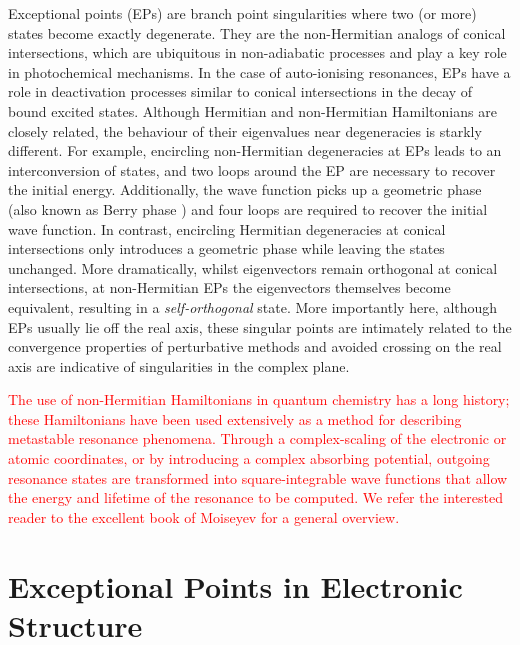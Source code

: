 \documentclass[aps,prb,reprint,noshowkeys,linenumbers,superscriptaddress]{revtex4-1}
\newcommand{\titou}[1]{\textcolor{red}{#1}}
\begin{document}
Exceptional points (EPs) are branch point singularities where two (or more) states become exactly degenerate. \cite{MoiseyevBook,Heiss_1988,Heiss_1990,Heiss_1999,Berry_2011,Heiss_2012,Heiss_2016,Benda_2018}
They are the non-Hermitian analogs of conical intersections, \cite{Yarkony_1996} which are ubiquitous in non-adiabatic processes and play a key role in photochemical mechanisms.
In the case of auto-ionising resonances, EPs have a role in deactivation processes similar to conical intersections in the decay of bound excited states. \cite{Benda_2018}
Although Hermitian and non-Hermitian Hamiltonians are closely related, the behaviour of their eigenvalues near degeneracies is starkly different.
For example, encircling non-Hermitian degeneracies at EPs leads to an interconversion of states, and two loops around the EP are necessary to recover the initial energy. \cite{MoiseyevBook,Heiss_2016,Benda_2018}
Additionally, the wave function picks up a geometric phase (also known as Berry phase \cite{Berry_1984}) and four loops are required to recover the initial wave function.
In contrast, encircling Hermitian degeneracies at conical intersections only introduces a geometric phase while leaving the states unchanged.
More dramatically, whilst eigenvectors remain orthogonal at conical intersections, at non-Hermitian EPs the eigenvectors themselves become equivalent, resulting in a \textit{self-orthogonal} state. \cite{MoiseyevBook}
More importantly here, although EPs usually lie off the real axis, these singular points are intimately related to the convergence properties of perturbative methods and avoided crossing on the real axis are indicative of singularities in the complex plane. \cite{BenderBook,Olsen_1996,Olsen_2000,Olsen_2019,Mihalka_2017a,Mihalka_2017b,Mihalka_2019}

\titou{The use of non-Hermitian Hamiltonians in quantum chemistry has a long history; these Hamiltonians have been used extensively as a method for describing metastable resonance phenomena. \cite{MoiseyevBook}
Through a complex-scaling of the electronic or atomic coordinates,\cite{Moiseyev_1998} or by introducing a complex absorbing potential,\cite{Riss_1993,Ernzerhof_2006,Benda_2018} outgoing resonance states are transformed into square-integrable wave functions that allow the energy and lifetime of the resonance to be computed.
We refer the interested reader to the excellent book of Moiseyev for a general overview. \cite{MoiseyevBook}}

\section{Exceptional Points in Electronic Structure}
\label{sec:EPs}
\end{document}
